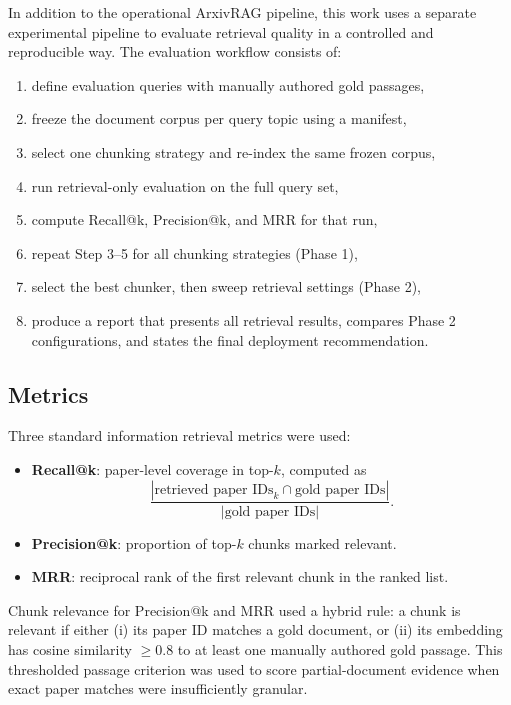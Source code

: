 \documentclass[a4paper,12pt]{article}
\begin{document}
In addition to the operational ArxivRAG pipeline, this work uses a separate experimental pipeline to evaluate retrieval quality in a controlled and reproducible way. The evaluation workflow consists of:

\begin{enumerate}
    \item define evaluation queries with manually authored gold passages,
    \item freeze the document corpus per query topic using a manifest,
    \item select one chunking strategy and re-index the same frozen corpus,
    \item run retrieval-only evaluation on the full query set,
    \item compute Recall@k, Precision@k, and MRR for that run,
    \item repeat Step 3--5 for all chunking strategies (Phase 1),
    \item select the best chunker, then sweep retrieval settings (Phase 2),
    \item produce a report that presents all retrieval results, compares Phase 2 configurations, and states the final deployment recommendation.
\end{enumerate}


\subsection{Metrics}

Three standard information retrieval metrics were used\cite{manning2008ir}:

\begin{itemize}
    \item \textbf{Recall@k}: paper-level coverage in top-$k$, computed as
    \[
    \frac{|\text{retrieved paper IDs}_{k} \cap \text{gold paper IDs}|}{|\text{gold paper IDs}|}.
    \]
    \item \textbf{Precision@k}: proportion of top-$k$ chunks marked relevant.
    \item \textbf{MRR}: reciprocal rank of the first relevant chunk in the ranked list.
\end{itemize}

Chunk relevance for Precision@k and MRR used a hybrid rule: a chunk is relevant if either (i) its paper ID matches a gold document, or (ii) its embedding has cosine similarity $\geq 0.8$ to at least one manually authored gold passage. This thresholded passage criterion was used to score partial-document evidence when exact paper matches were insufficiently granular.
\end{document}
